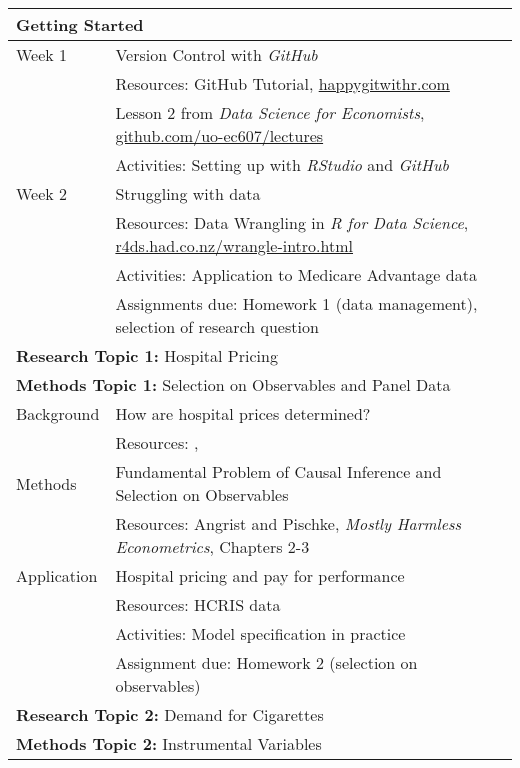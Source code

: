 \documentclass{article}
\begin{document}
\begin{longtable}{lp{13cm}}
  \hline
  \multicolumn{2}{l}{\textbf{Getting Started}} \\
  \hline\hline
  Week 1 & Version Control with \textit{GitHub} \\
         & Resources: GitHub Tutorial, \href{https://happygitwithr.com/}{happygitwithr.com} \\
         & \hspace{.4in} Lesson 2 from \textit{Data Science for Economists}, \href{https://github.com/uo-ec607/lectures}{github.com/uo-ec607/lectures} \\
         & Activities: Setting up with \textit{RStudio} and \textit{GitHub} \\
  \hline
  Week 2 & Struggling with data \\
         & Resources: Data Wrangling in \textit{R for Data Science}, \href{https://r4ds.had.co.nz/wrangle-intro.html}{r4ds.had.co.nz/wrangle-intro.html} \\
         & Activities: Application to Medicare Advantage data \\
         & Assignments due: Homework 1 (data management), selection of research question \\
  \hline
  \multicolumn{2}{l}{\textbf{Research Topic 1:} Hospital Pricing} \\
  \multicolumn{2}{l}{\textbf{Methods Topic 1:} Selection on Observables and Panel Data} \\
  \hline\hline
  Background & How are hospital prices determined? \\
             & Resources: \cite{cooper2017}, \cite{darden2018} \\
  \hline
  Methods & Fundamental Problem of Causal Inference and Selection on Observables \\
          & Resources: Angrist and Pischke, \textit{Mostly Harmless Econometrics}, Chapters 2-3 \\
  \hline
  Application & Hospital pricing and pay for performance \\
              & Resources: HCRIS data \\
              & Activities: Model specification in practice \citep{darden2018} \\
              & Assignment due: Homework 2 (selection on observables) \\
  \hline
  \multicolumn{2}{l}{\textbf{Research Topic 2:} Demand for Cigarettes} \\
  \multicolumn{2}{l}{\textbf{Methods Topic 2:} Instrumental Variables} \\

\end{longtable}
\end{document}
